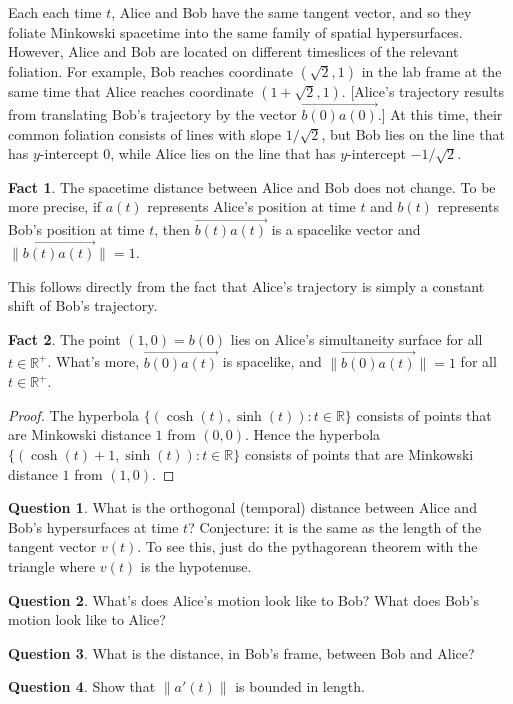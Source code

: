 \documentclass[tikz,border=10pt,fleqn]{article}
\theoremstyle{definition}
\newtheorem*{question}{Question}
\newtheorem*{fact}{Fact}
\newcommand{\vecc}[1]{\overrightarrow{#1}}
\begin{document}
  \bigskip \noindent Each each time $t$, Alice and Bob have the same
  tangent vector, and so they foliate Minkowski spacetime into the
  same family of spatial hypersurfaces. However, Alice and Bob are
  located on different timeslices of the relevant foliation. For
  example, Bob reaches coordinate $(\sqrt{2},1)$ in the lab frame at
  the same time that Alice reaches coordinate
  $(1+\sqrt{2},1)$. [Alice's trajectory results from translating Bob's
  trajectory by the vector $\vecc{b(0)a(0)}$.]  At this time, their
  common foliation consists of lines with slope $1/\sqrt{2}$, but Bob
  lies on the line that has $y$-intercept $0$, while Alice lies on the
  line that has $y$-intercept $-1/\sqrt{2}$.

  \begin{fact} The spacetime distance between Alice and Bob does not
    change. To be more precise, if $a(t)$ represents Alice's position
    at time $t$ and $b(t)$ represents Bob's position at time $t$, then
    $\vecc{b(t)a(t)}$ is a spacelike vector and
    $\| \vecc{b(t)a(t)} \|=1$. \end{fact}

This follows directly from the fact that Alice's trajectory is simply
a constant shift of Bob's trajectory.

\begin{fact} The point $(1,0)=b(0)$ lies on Alice's simultaneity
  surface for all $t\in\mathbb{R}^+$. What's more, $\vecc{b(0)a(t)}$
  is spacelike, and $\| \vecc{b(0)a(t)}\| =1$ for all
  $t\in\mathbb{R}^+$. \end{fact}

\begin{proof} The hyperbola
  $\{ (\cosh (t),\sinh(t)):t\in\mathbb{R} \}$ consists of points that
  are Minkowski distance $1$ from $(0,0)$. Hence the hyperbola
  $\{ (\cosh (t)+1,\sinh (t)):t\in\mathbb{R}\}$ consists of points
  that are Minkowski distance $1$ from $(1,0)$.
\end{proof}


\begin{question} What is the orthogonal (temporal) distance between
  Alice and Bob's hypersurfaces at time $t$? Conjecture: it is the
  same as the length of the tangent vector $v(t)$. To see this, just
  do the pythagorean theorem with the triangle where $v(t)$ is the
  hypotenuse. \end{question}

\begin{question} What's does Alice's motion look like to Bob? What
  does Bob's motion look like to Alice? \end{question}

\begin{question} What is the distance, in Bob's frame, between Bob and
  Alice? \end{question}

\begin{question} Show that $\| a'(t)\|$ is bounded in
  length. \end{question}   
\end{document}
